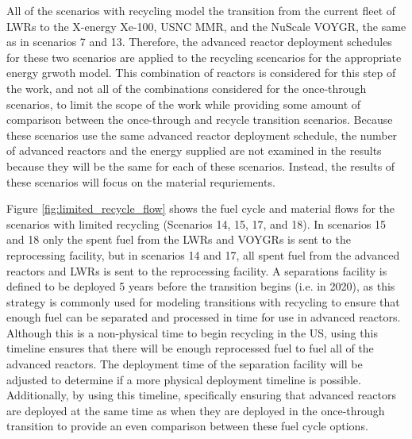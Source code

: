 All of the scenarios with recycling model the transition from the 
current fleet of \glspl{LWR} to the X-energy Xe-100, \gls{USNC} \gls{MMR}, 
and the NuScale VOYGR, the same as in scenarios 7 and 13. Therefore, 
the advanced reactor deployment schedules for these two scenarios are applied 
to the recycling scencarios for the appropriate energy grwoth model. 
This combination 
of reactors is considered for this step of the work, and not all of the 
combinations considered for the once-through scenarios, to limit the scope 
of the work while providing some amount of comparison between the 
once-through and recycle transition scenarios. Because these scenarios 
use the same advanced reactor deployment schedule, the number of 
advanced reactors and the energy supplied are not examined in the 
results because they will be the same for each of these scenarios. Instead, 
the results of these scenarios will focus on the material requriements. 

Figure \ref{fig:limited_recycle_flow} shows the fuel cycle and material flows 
for the scenarios with limited recycling (Scenarios 14, 15, 17, and 18). 
In scenarios 15 and 18 only the spent fuel from the \glspl{LWR} and 
VOYGRs is sent to the reprocessing facility, but in scenarios 14 and 17, 
all spent fuel from the advanced reactors and \glspl{LWR} is sent to the 
reprocessing facility. A separations facility is defined to be deployed 5 
years before the transition 
begins (i.e. in 2020), as this strategy is commonly used for modeling 
transitions with recycling \cite{passerini_systematic_2014,richards_application_2021}
to ensure that enough fuel can be separated and 
processed in time for use in advanced reactors. Although this is a 
non-physical time to begin recycling in the US, using this timeline ensures 
that there will be enough reprocessed fuel to fuel all of the advanced 
reactors. The deployment time of the separation facility will be adjusted 
to determine if a more physical deployment timeline is possible. Additionally, 
by using this timeline, specifically ensuring that advanced reactors 
are deployed at the same time as when they are deployed in the once-through 
transition to provide an even comparison between these fuel cycle options. 



